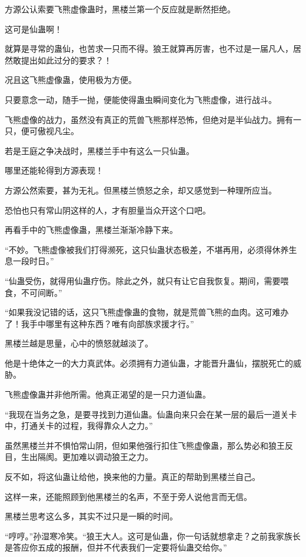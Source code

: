 
\begin{this_body}

方源公认索要飞熊虚像蛊时，黑楼兰第一个反应就是断然拒绝。

这可是仙蛊啊！

就算是寻常的蛊仙，也苦求一只而不得。狼王就算再厉害，也不过是一届凡人，居然敢提出如此过分的要求？！

况且这飞熊虚像蛊，使用极为方便。

只要意念一动，随手一抛，便能使得蛊虫瞬间变化为飞熊虚像，进行战斗。

飞熊虚像的战力，虽然没有真正的荒兽飞熊那样恐怖，但绝对是半仙战力。拥有一只，便可傲视凡尘。

若是王庭之争决战时，黑楼兰手中有这么一只仙蛊。

哪里还能轮得到方源表现！

方源公然索要，甚为无礼。但黑楼兰愤怒之余，却又感觉到一种理所应当。

恐怕也只有常山阴这样的人，才有胆量当众开这个口吧。

再看手中的飞熊虚像蛊，黑楼兰渐渐冷静下来。

“不妙。飞熊虚像被我们打得濒死，这只仙蛊状态极差，不堪再用，必须得休养生息一段时日。”

“仙蛊受伤，就得用仙蛊疗伤。除此之外，就只有让它自我恢复。期间，需要喂食，不可间断。”

“如果我没记错的话，这只飞熊虚像蛊的食物，就是荒兽飞熊的血肉。这可难办了！我手中哪里有这种东西？唯有向部族求援才行。”

黑楼兰越是思量，心中的愤怒就越淡了。

他是十绝体之一的大力真武体。必须拥有力道仙蛊，才能晋升蛊仙，摆脱死亡的威胁。

飞熊虚像蛊并非他所需。他真正渴望的是一只力道仙蛊。

“我现在当务之急，是要寻找到力道仙蛊。仙蛊向来只会在某一层的最后一道关卡中，打通关卡的过程，我得靠众人之力。”

虽然黑楼兰并不惧怕常山阴，但如果他强行扣住飞熊虚像蛊，那么势必和狼王反目，生出隔阂。更加难以调动狼王之力。

反不如，将这仙蛊让给他，换来他的力量。真正的帮助到黑楼兰自己。

这样一来，还能照顾到他黑楼兰的名声，不至于旁人说他言而无信。

黑楼兰思考这么多，其实不过只是一瞬的时间。

“哼哼。”孙湿寒冷笑。“狼王大人。这可是仙蛊，你一句话就想拿走？之前我家族长是答应你五成的报酬，但并不代表我们一定要将仙蛊交给你。”


\end{this_body}
